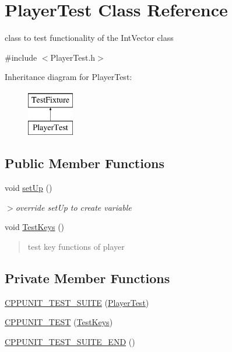 \hypertarget{classPlayerTest}{\section{Player\-Test Class Reference}
\label{classPlayerTest}
}


class to test functionality of the Int\-Vector class  




{\ttfamily \#include $<$Player\-Test.\-h$>$}

Inheritance diagram for Player\-Test\-:\begin{figure}[H]
\begin{center}
\leavevmode
\includegraphics[height=2.000000cm]{classPlayerTest}
\end{center}
\end{figure}
\subsection*{Public Member Functions}
\begin{DoxyCompactItemize}
\item 
void \hyperlink{classPlayerTest_a5fc4e3940fe2442cc760b12985ceef3b}{set\-Up} ()
\begin{DoxyCompactList}\small\item\em $>$override {\ttfamily set\-Up} to create variable \end{DoxyCompactList}\item 
void \hyperlink{classPlayerTest_af7b63b181271a7fa168cf73b0d85d346}{Test\-Keys} ()
\begin{DoxyCompactList}\small\item\em \begin{quotation}
test key functions of player \end{quotation}
\end{DoxyCompactList}\end{DoxyCompactItemize}
\subsection*{Private Member Functions}
\begin{DoxyCompactItemize}
\item 
\hyperlink{classPlayerTest_a02dcdc23e12801f583826e13aa38609d}{C\-P\-P\-U\-N\-I\-T\-\_\-\-T\-E\-S\-T\-\_\-\-S\-U\-I\-T\-E} (\hyperlink{classPlayerTest}{Player\-Test})
\item 
\hyperlink{classPlayerTest_a0159eeaf95cc6bf3ddc352efd6049530}{C\-P\-P\-U\-N\-I\-T\-\_\-\-T\-E\-S\-T} (\hyperlink{classPlayerTest_af7b63b181271a7fa168cf73b0d85d346}{Test\-Keys})
\item 
\hyperlink{classPlayerTest_ae5022bed52c0af937d91f24e614d8ea6}{C\-P\-P\-U\-N\-I\-T\-\_\-\-T\-E\-S\-T\-\_\-\-S\-U\-I\-T\-E\-\_\-\-E\-N\-D} ()
\end{DoxyCompactItemize}
